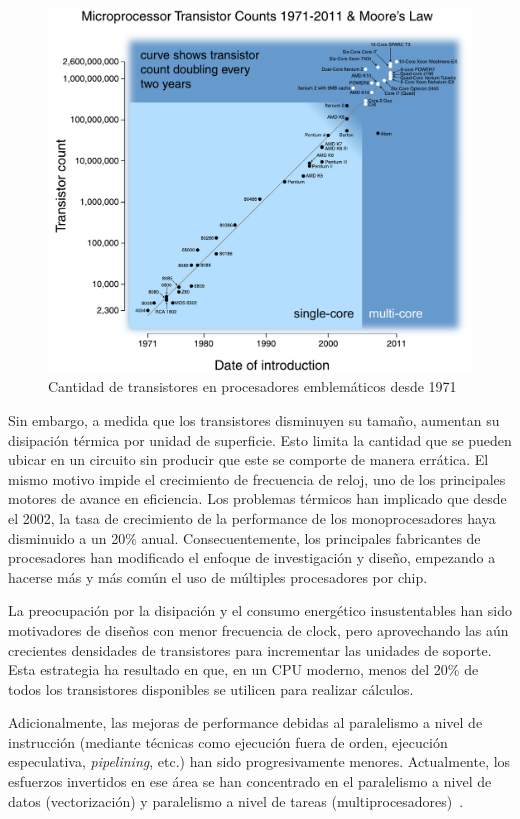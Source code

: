 \begin{figure}[htbp]
   \centering
   \includegraphics[width=\plotwidth]{images/moore-law.pdf}
   \caption{Cantidad de transistores en procesadores emblem\'aticos desde 1971}
   \label{moore-law}
\end{figure}

Sin embargo, a medida que los transistores disminuyen su tama\~no, aumentan su disipaci\'on t\'ermica por unidad de superficie.
Esto limita la cantidad que se pueden ubicar en un circuito sin producir que este se comporte de manera err\'atica.
El mismo motivo impide el crecimiento de frecuencia de reloj, uno de los principales motores de avance en eficiencia.
Los problemas t\'ermicos han implicado que desde el 2002, la tasa de crecimiento de la performance de los monoprocesadores haya disminuido a un 20\% anual.
Consecuentemente, los principales fabricantes de procesadores han modificado el enfoque de investigaci\'on y dise\~no, empezando a hacerse m\'as y m\'as com\'un el uso de m\'ultiples procesadores por chip.

La preocupaci\'on por la disipaci\'on y el consumo energ\'etico insustentables han sido motivadores de dise\~nos con menor frecuencia de clock, pero aprovechando las a\'un crecientes densidades de transistores para incrementar las unidades de soporte.
Esta estrategia ha resultado en que, en un CPU moderno, menos del 20\% de todos los transistores disponibles se utilicen para realizar c\'alculos.

Adicionalmente, las mejoras de performance debidas al paralelismo a nivel de instrucci\'on (mediante t\'ecnicas como ejecuci\'on fuera de orden, ejecuci\'on especulativa, \textit{pipelining}, etc.) han sido progresivamente menores.
Actualmente, los esfuerzos invertidos en ese \'area se han concentrado en el paralelismo a nivel de datos (vectorizaci\'on) y paralelismo a nivel de tareas (multiprocesadores)~\cite{HennessyPatterson}.

